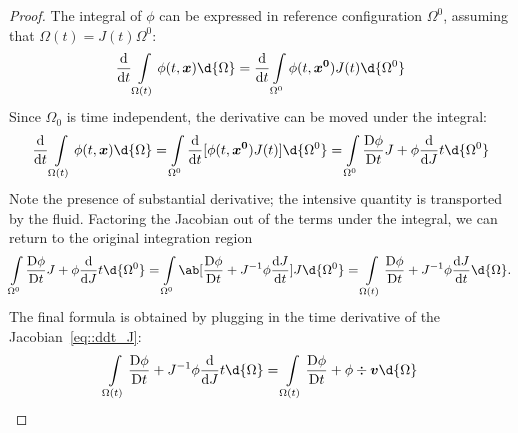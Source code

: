 \documentclass[justified, nobib,a4paper]{tufte-handout}
\begin{document}
\begin{proof}
	The integral of \(\phi\) can be expressed in reference configuration 
  \(\Omega^0\), assuming that \(\Omega(t) = J(t)\Omega^0\):
	\begin{equation}
    \odv{}{t} \int\limits_{\Omega(t)} \phi(t, \vec{x}) \d{\Omega} = 
    \odv{}{t} \int\limits_{\Omega^0} \phi(t, \vec{x^0})J(t) \d{\Omega^0} 
	\end{equation}
	Since \(\Omega_0\) is time independent, the derivative can be moved
  under the integral:
	\begin{equation}
    \odv{}{t} \int\limits_{\Omega(t)} \phi(t, \vec{x}) \d{\Omega} = 
    \int\limits_{\Omega^0} \odv{}{t}[\phi(t, \vec{x^0})J(t)] \d{\Omega^0} =
    \int\limits_{\Omega^0} \mdv{\phi}{t}J + \phi\odv{}{J}{t} \d{\Omega^0} 
	\end{equation}
  Note the presence of substantial derivative; the intensive quantity is
  transported by the fluid.
	Factoring the Jacobian out of the terms under the integral, we can return
  to the original integration region
	\begin{equation}
    \int\limits_{\Omega^0} \mdv{\phi}{t}J + \phi\odv{}{J}{t} \d{\Omega^0} = 
    \int\limits_{\Omega^0} \ab[\mdv{\phi}{t} + J^{-1}\phi\odv{J}{t}]J \d{\Omega^0} = 
    \int\limits_{\Omega(t)} \mdv{\phi}{t} + J^{-1}\phi\odv{J}{t} \d{\Omega}.
	\end{equation}
  The final formula is obtained by plugging in the time derivative of the 
  Jacobian~\autoref{eq::ddt_J}:
  \begin{equation*}
    \int\limits_{\Omega(t)} \mdv{\phi}{t} + J^{-1}\phi\odv{}{J}{t} \d{\Omega}
    = \int\limits_{\Omega(t)} \mdv{\phi}{t} + \phi \div\vec{v} \d{\Omega}
  \end{equation*}
\end{proof}
\end{document}
